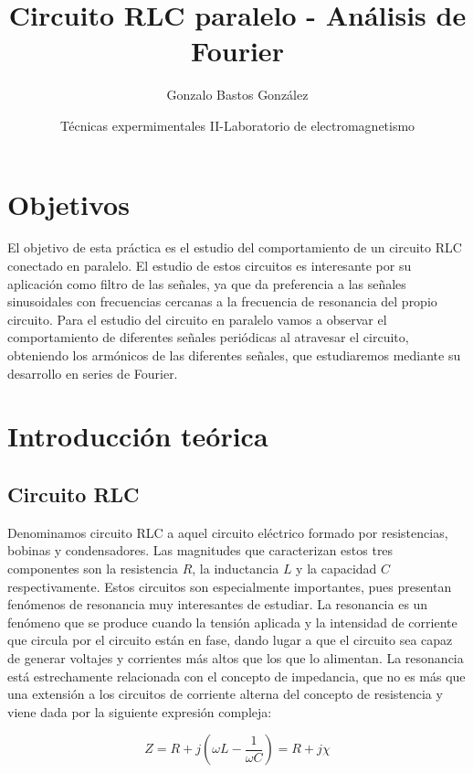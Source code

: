 \documentclass[a4paper,12pt,titlepage]{article}
\title{Circuito RLC paralelo - Análisis de Fourier}
\author{Gonzalo Bastos González}
\date{Técnicas expermimentales II-Laboratorio de electromagnetismo}
\begin{document}
\maketitle
\tableofcontents

\newpage

\section{Objetivos}

El objetivo de esta práctica es el estudio del comportamiento de un circuito RLC conectado en paralelo. El estudio de estos circuitos es interesante por su aplicación como filtro de las señales, ya que da preferencia a las señales sinusoidales con frecuencias cercanas a la frecuencia de resonancia del propio circuito. Para el estudio del circuito en paralelo vamos a observar el comportamiento de diferentes señales periódicas al atravesar el circuito, obteniendo los armónicos de las diferentes señales, que estudiaremos mediante su desarrollo en series de Fourier.

\section{Introducción teórica}

\subsection{Circuito RLC}

Denominamos circuito RLC a aquel circuito eléctrico formado por resistencias, bobinas y condensadores. Las magnitudes que caracterizan estos tres componentes son la resistencia $R$, la inductancia $L$ y la capacidad $C$ respectivamente. Estos circuitos son especialmente importantes, pues presentan fenómenos de resonancia muy interesantes de estudiar. La resonancia es un fenómeno que se produce cuando la tensión aplicada y la intensidad de corriente que circula por el circuito están en fase, dando lugar a que el circuito sea capaz de generar voltajes y corrientes más altos que los que lo alimentan. La resonancia está estrechamente relacionada con el concepto de impedancia, que no es más que una extensión a los circuitos de corriente alterna del concepto de resistencia y viene dada por la siguiente expresión compleja:

\begin{equation}
    Z = R + j\left(\omega L - \frac{1}{\omega C} \right) = R + j\chi
\end{equation}
\end{document}
